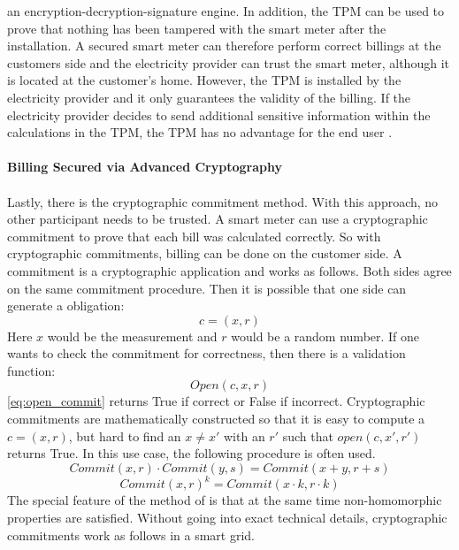 an encryption-decryption-signature engine. In addition, the \gls{TPM} can be used to prove that nothing has been tampered with the smart meter after the installation. A secured smart meter can therefore perform correct billings at the customers side and the electricity provider can trust the smart meter, although it is located at the customer's home. However, the \gls{TPM} is installed by the electricity provider and it only guarantees the validity of the billing. If the electricity provider decides to send additional sensitive information within the calculations in the \gls{TPM}, the \gls{TPM} has no advantage for the end user \cite{finster2014privacy}.\clearpage\\\\\textbf{Billing Secured via Advanced Cryptography}
\\
\\
Lastly, there is the cryptographic commitment method.
With this approach, no other participant needs to be trusted. A smart meter can use a cryptographic commitment to prove that each bill was calculated correctly. So with cryptographic commitments, billing can be done on the customer side. A commitment is a cryptographic application and works as follows. Both sides agree on the same commitment procedure. Then it is possible that one side can generate a obligation:\begin{equation}
\label{eq:commitment}
c=(x,r)
\end{equation} 
Here $x$ would be the measurement and $r$ would be a random number. If one wants to check the commitment for correctness, then there is a validation function:
\begin{equation}
\label{eq:open_commit}
Open(c,x,r)
\end{equation} 
\ref{eq:open_commit} returns True if correct or False if incorrect.
Cryptographic commitments are mathematically constructed so that it is easy to compute a $c=(x,r)$, but hard to find an $x \neq x'$ with an $r'$ such that $open(c,x',r')$ returns True. In this use case, the following procedure is often used.\\
\begin{equation}
\label{eq:homomorph1}
Commit(x, r) \cdot Commit(y, s) = Commit(x+y, r+s)
\end{equation} 
\begin{equation}
\label{eq:homomorph2}
Commit(x, r)^{k} = Commit(x \cdot k, r \cdot k)
\end{equation} 
The special feature of the method of \cite{pedersen1991non} is that at the same time non-homomorphic properties are satisfied. Without going into exact technical details, cryptographic commitments work as follows in a smart grid.\\
